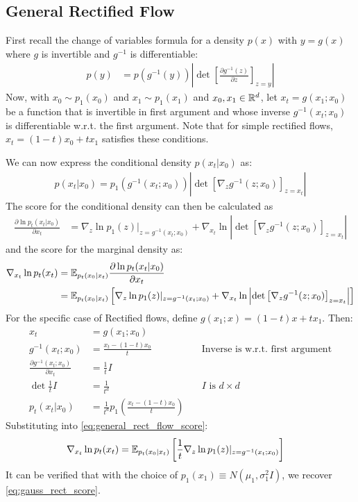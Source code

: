 \subsection{General Rectified Flow}
\label{sec:general_rect_flow}

First recall the change of variables formula for a density $p(x)$ with $y=g(x)$ where $g$ is invertible and $g^{-1}$ is differentiable:
\begin{align}
p(y) &= p(g^{-1}(y))\left\lvert \det \left[\frac{\partial g^{-1}(z)}{\partial z}\right]_{z=y} \right\rvert
\end{align}
Now, with $x_0 \sim p_1(x_0)$ and $x_1 \sim p_1(x_1)$ and $x_0,x_1 \in \mathbb{R}^d$, let $x_t = g(x_1; x_0)$ be a function that is invertible in first argument and whose inverse $g^{-1}(x_t;x_0)$ is differentiable w.r.t. the first argument.
Note that for simple rectified flows, $x_t = (1-t)x_0 + tx_1$ satisfies these conditions.

We can now express the conditional density $p(x_t | x_0)$ as:
\begin{align}
p(x_t | x_0) = p_1(g^{-1}(x_t;x_0))\left\lvert \det \left[\nabla_z g^{-1}(z;x_0)\right]_{z=x_t} \right\rvert
\end{align}
The score for the conditional density can then be calculated as
\begin{align}
 \frac{\partial \ln p_t(x_t | x_0)}{\partial x_t} &= \nabla_z \ln p_1(z)|_{z=g^{-1}(x_t; x_0)} + \nabla_{x_t} \ln \left\lvert \det \left[\nabla_z g^{-1}(z;x_0)\right]_{z=x_t} \right\rvert
\end{align}
and the score for the marginal density as:
\begin{align}
 \nabla_{x_t} \ln p_t(x_t) &= \mathbb{E}_{p_t(x_0|x_t)} \frac{\partial \ln p_t(x_t | x_0)}{\partial x_t} \\
 \label{eq:general_rect_flow_score}
 &= \mathbb{E}_{p_t(x_0|x_t)} \left[\nabla_z \ln p_1(z)|_{z=g^{-1}(x_t; x_0)} + \nabla_{x_t} \ln \left\lvert \det \left[\nabla_z g^{-1}(z;x_0)\right]_{z=x_t} \right\rvert \right]
\end{align}
For the specific case of Rectified flows, define $g(x_1;x) = (1-t)x + tx_1$.
Then:
\begin{align}
x_t &= g(x_1; x_0) \\
g^{-1}(x_t; x_0) &= \frac{x_t - (1-t)x_0}{t} & \quad \text{Inverse is w.r.t. first argument} \\
\frac{\partial g^{-1}(x_t; x_0)}{\partial x_t} &= \frac{1}{t}I \\
\det \frac{1}{t}I &= \frac{1}{t^d} & \quad \text{$I$ is $d \times d$} \\
p_t(x_t | x_0) &= \frac{1}{t^d}p_1\left(\frac{x_t - (1-t)x_0}{t}\right)
\end{align}
Substituting into \cref{eq:general_rect_flow_score}:
\begin{align}
\nabla_{x_t} \ln p_t(x_t) &= \mathbb{E}_{p_t(x_0|x_t)} \left[\frac{1}{t}\nabla_z \ln p_1(z)|_{z=g^{-1}(x_t; x_0)} \right]
\end{align}
It can be verified that with the choice of $p_1(x_1) \equiv N(\mu_1, \sigma_1^2 I)$, we recover \cref{eq:gauss_rect_score}.

